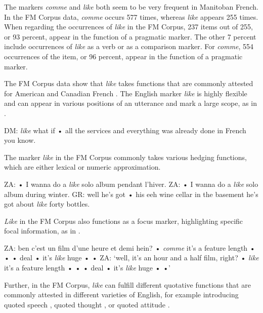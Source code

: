 \documentclass[output=paper]{langscibook}
\begin{document}
The markers \textit{comme} and \textit{like} both seem to be very frequent in Manitoban French. In the FM Corpus data, \textit{comme} occurs 577 times, whereas \textit{like} appears 255 times. When regarding the occurrences of \textit{like} in the FM Corpus, 237 items out of 255, or 93 percent, appear in the function of a pragmatic marker. The other 7 percent include occurrences of \textit{like} as a verb or as a comparison marker. For \textit{comme}, 554 occurrences of the item, or 96 percent, appear in the function of a pragmatic marker. 

The FM Corpus data show that \textit{like} takes functions that are commonly attested for American and Canadian French \citep{DArcy.2017}. The English marker \textit{like} is highly flexible and can appear in various positions of an utterance and mark a large scope, as in .

\begin{exe}
    \ex\label{hennecke:ex:1} DM: \textit{like} what if • all the services and everything was already done in French you know.
\end{exe}

\noindent
The marker \textit{like} in the FM Corpus commonly takes various hedging functions, which are either lexical  or numeric  approximation.

\begin{exe}
    \ex\label{hennecke:ex:2} ZA: • I wanna do a \textit{like} solo album pendant l’hiver.
    \glt ZA: • I wanna do a \textit{like} solo album during winter.
    \ex\label{hennecke:ex:3} GR: well he’s got • his eeh wine cellar in the basement he’s got about \textit{like} forty bottles.
\end{exe}

\noindent
\textit{Like} in the FM Corpus also functions as a focus marker, highlighting specific focal information, as in .

\begin{exe}
    \ex\label{hennecke:ex:4} ZA: ben c’est un film d’une heure et demi hein? • \textit{comme} it’s a feature length • • • deal • it’s \textit{like} huge • •
    \glt ZA: ‘well, it’s an hour and a half film, right? •  \textit{like} it’s a feature length • • •  deal • it’s \textit{like} huge • •’
\end{exe}

Further, in the FM Corpus, \textit{like} can fulfill different quotative functions that are commonly attested in different varieties of English, for example introducing quoted speech , quoted thought , or quoted attitude .
\end{document}
